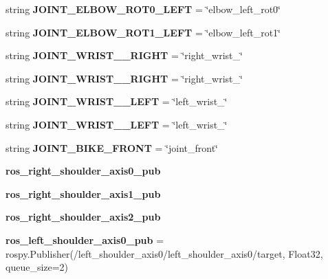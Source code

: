 \begin{DoxyCompactItemize}
string {\bfseries J\+O\+I\+N\+T\+\_\+\+E\+L\+B\+O\+W\+\_\+\+R\+O\+T0\+\_\+\+L\+E\+FT} = \char`\"{}elbow\+\_\+left\+\_\+rot0\char`\"{}
\item 
\mbox{\label{namespacedoxytest_a6a017cf9672525139da628cf295a5bf5}} 
string {\bfseries J\+O\+I\+N\+T\+\_\+\+E\+L\+B\+O\+W\+\_\+\+R\+O\+T1\+\_\+\+L\+E\+FT} = \char`\"{}elbow\+\_\+left\+\_\+rot1\char`\"{}
\item 
\mbox{\label{namespacedoxytest_a3790a31283a7de3cd716add0418e2403}} 
string {\bfseries J\+O\+I\+N\+T\+\_\+\+W\+R\+I\+S\+T\+\_\+\_\+\+R\+I\+G\+HT} = \char`\"{}right\+\_\+wrist\+\_\char`\"{}
\item 
\mbox{\label{namespacedoxytest_a51e8619535526ebbb72e5933284002a1}} 
string {\bfseries J\+O\+I\+N\+T\+\_\+\+W\+R\+I\+S\+T\+\_\+\_\+\+R\+I\+G\+HT} = \char`\"{}right\+\_\+wrist\+\_\char`\"{}
\item 
\mbox{\label{namespacedoxytest_ad1bf68c145579920ed69f7517c01e973}} 
string {\bfseries J\+O\+I\+N\+T\+\_\+\+W\+R\+I\+S\+T\+\_\+\_\+\+L\+E\+FT} = \char`\"{}left\+\_\+wrist\+\_\char`\"{}
\item 
\mbox{\label{namespacedoxytest_a4b19b5fbe3c45ac00644abea646d198e}} 
string {\bfseries J\+O\+I\+N\+T\+\_\+\+W\+R\+I\+S\+T\+\_\+\_\+\+L\+E\+FT} = \char`\"{}left\+\_\+wrist\+\_\char`\"{}
\item 
\mbox{\label{namespacedoxytest_a82d5369b9c1a20a3ca675b9ace0adc3a}} 
string {\bfseries J\+O\+I\+N\+T\+\_\+\+B\+I\+K\+E\+\_\+\+F\+R\+O\+NT} = \char`\"{}joint\+\_\+front\char`\"{}
\item 
{\bfseries ros\+\_\+right\+\_\+shoulder\+\_\+axis0\+\_\+pub}
\item 
{\bfseries ros\+\_\+right\+\_\+shoulder\+\_\+axis1\+\_\+pub}
\item 
{\bfseries ros\+\_\+right\+\_\+shoulder\+\_\+axis2\+\_\+pub}
\item 
\mbox{\label{namespacedoxytest_a98904c6b967e349983b9d99e01843c54}} 
{\bfseries ros\+\_\+left\+\_\+shoulder\+\_\+axis0\+\_\+pub} = rospy.\+Publisher(\textquotesingle{}/left\+\_\+shoulder\+\_\+axis0/left\+\_\+shoulder\+\_\+axis0/target\textquotesingle{}, Float32, queue\+\_\+size=2)

\end{DoxyCompactItemize}
